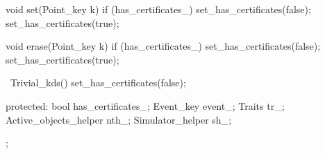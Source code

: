 \begin{ccExampleCode}
{  void set(Point_key k) {
    if (has_certificates_) {
      set_has_certificates(false);
      set_has_certificates(true);
    }
  }

  void erase(Point_key k) {
    if (has_certificates_) {
      set_has_certificates(false);
      set_has_certificates(true);
    }
  }

  ~Trivial_kds(){
     set_has_certificates(false);
  }

protected:
  bool has_certificates_;
  Event_key event_;
  Traits tr_;
  Active_objects_helper nth_;
  Simulator_helper sh_;
};

\end{ccExampleCode}

